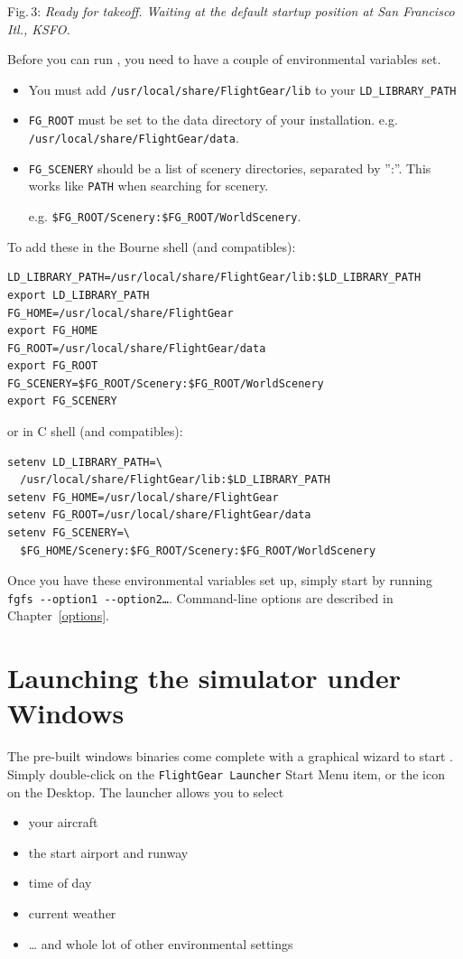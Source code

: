  \noindent
Fig.\,3: \textit{Ready for takeoff. Waiting at the default startup position at San
Francisco Itl., KSFO.}
\medskip

Before you can run \FlightGear{}, you need to have a couple of environmental variables set.

\begin{itemize}
\item You must add \texttt{/usr/local/share/FlightGear/lib} to your \texttt{LD\_LIBRARY\_PATH}
\item \texttt{FG\_ROOT} must be set to the data directory of your \FlightGear{} installation. e.g. \texttt{/usr/local/share/FlightGear/data}.
\item \texttt{FG\_SCENERY} should be a list of scenery directories, separated by '':''. This works like \texttt{PATH} when searching for scenery. 

e.g. \texttt{\$FG\_ROOT/Scenery:\$FG\_ROOT/WorldScenery}.
\end{itemize}

\noindent
To add these in the Bourne shell (and compatibles):
\begin{verbatim}
LD_LIBRARY_PATH=/usr/local/share/FlightGear/lib:$LD_LIBRARY_PATH
export LD_LIBRARY_PATH
FG_HOME=/usr/local/share/FlightGear
export FG_HOME
FG_ROOT=/usr/local/share/FlightGear/data
export FG_ROOT
FG_SCENERY=$FG_ROOT/Scenery:$FG_ROOT/WorldScenery
export FG_SCENERY
\end{verbatim}
\noindent
 or in C shell (and compatibles):
\begin{verbatim}
setenv LD_LIBRARY_PATH=\
  /usr/local/share/FlightGear/lib:$LD_LIBRARY_PATH
setenv FG_HOME=/usr/local/share/FlightGear
setenv FG_ROOT=/usr/local/share/FlightGear/data
setenv FG_SCENERY=\
  $FG_HOME/Scenery:$FG_ROOT/Scenery:$FG_ROOT/WorldScenery
\end{verbatim}
Once you have these environmental variables set up, simply start \FlightGear{} by running
\texttt{fgfs -$ $-option1 -$ $-option2\dots}.
\medskip
Command-line options are described in Chapter~\ref{options}.

\section{Launching the simulator under Windows}
The pre-built windows binaries come complete with a graphical wizard to start \FlightGear{}. Simply double-click on the \texttt{FlightGear Launcher} Start Menu item, or the icon on the Desktop. The launcher allows you to select
\begin{itemize}
\item your aircraft
\item the start airport and runway
\item time of day
\item current weather
\item \dots{} and whole lot of other environmental settings
\end{itemize}

